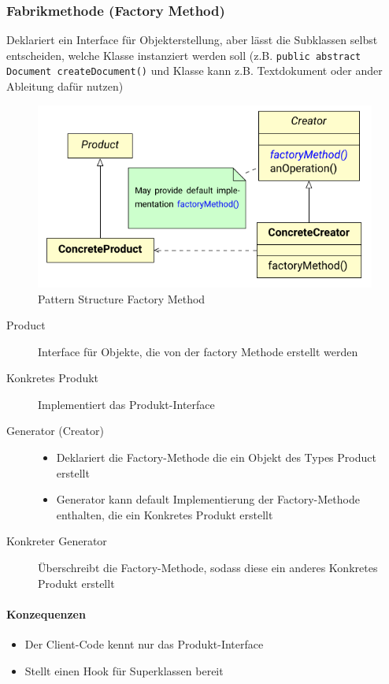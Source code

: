\documentclass[
    ngerman,
    color=3b,
    summary,
    boxarc,
    main,
]{rubos-tuda-template}
\begin{document}
\subsubsection{Fabrikmethode (Factory Method)}
\begin{definition}
    Deklariert ein Interface für Objekterstellung, aber lässt die Subklassen selbst entscheiden, welche Klasse instanziert werden soll (z.B. \texttt{public abstract Document createDocument()} und Klasse kann z.B. Textdokument oder ander Ableitung dafür nutzen)
\end{definition}
\begin{figure}[ht]
    \centering
    \includegraphics[width=.5\textwidth]{bilder/factory_method_pattern.pdf}
    \caption{Pattern Structure Factory Method}
\end{figure}
\FloatBarrier
\begin{description}
    \item[Product] Interface für Objekte, die von der factory Methode erstellt werden
    \item[Konkretes Produkt] Implementiert das Produkt-Interface
    \item[Generator (Creator)] \begin{itemize}
              \item Deklariert die Factory-Methode die ein Objekt des Types Product erstellt
              \item Generator kann default Implementierung der Factory-Methode enthalten, die ein Konkretes Produkt erstellt
          \end{itemize}
    \item[Konkreter Generator] Überschreibt die Factory-Methode, sodass diese ein anderes Konkretes Produkt erstellt
\end{description}
\paragraph{Konzequenzen}
\begin{itemize}
    \item Der Client-Code kennt nur das Produkt-Interface
    \item Stellt einen Hook für Superklassen bereit
\end{itemize}
\end{document}
